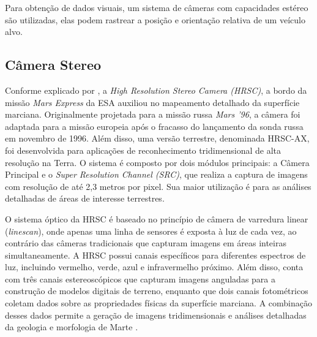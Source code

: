 Para obtenção de dados visuais, um sistema de câmeras com capacidades estéreo são utilizadas, elas podem rastrear a posição e orientação relativa de um veículo alvo.

\subsection{Câmera Stereo}

Conforme explicado por \cite{esaMarsExpress}, a \emph{High Resolution Stereo Camera (HRSC)}, a bordo da missão \emph{Mars Express} da ESA auxiliou no mapeamento detalhado da superfície marciana.
Originalmente projetada para a missão russa \emph{Mars '96}, a câmera foi adaptada para a missão europeia após o fracasso do lançamento da sonda russa em novembro de 1996.
Além disso, uma versão terrestre, denominada HRSC-AX, foi desenvolvida para aplicações de reconhecimento tridimensional de alta resolução na Terra.
O sistema é composto por dois módulos principais: a Câmera Principal e o \emph{Super Resolution Channel (SRC)}, que realiza a captura de imagens com resolução de até 2,3 metros por pixel. Sua maior utilização é para as análises detalhadas de áreas de interesse terrestres.

O sistema óptico da HRSC é baseado no princípio de câmera de varredura linear (\emph{linescan}), onde apenas uma linha de sensores é exposta à luz de cada vez, ao contrário das câmeras tradicionais que capturam imagens em áreas inteiras simultaneamente.
A HRSC possui canais específicos para diferentes espectros de luz, incluindo vermelho, verde, azul e infravermelho próximo.
Além disso, conta com três canais estereoscópicos que capturam imagens anguladas para a construção de modelos digitais de terreno, enquanto que dois canais fotométricos coletam dados sobre as propriedades físicas da superfície marciana. 
A combinação desses dados permite a geração de imagens tridimensionais e análises detalhadas da geologia e morfologia de Marte \cite{esaMarsExpress}.

